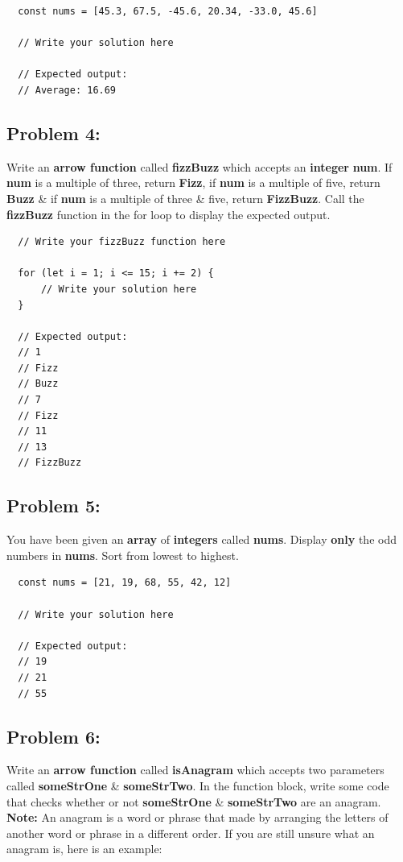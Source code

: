 \documentclass{article}
\begin{document}
\begin{verbatim}
  const nums = [45.3, 67.5, -45.6, 20.34, -33.0, 45.6]

  // Write your solution here

  // Expected output:
  // Average: 16.69 
\end{verbatim}

\subsection*{Problem 4:}
Write an \textbf{arrow function} called \textbf{fizzBuzz} which accepts an \textbf{integer} \textbf{num}. If \textbf{num} is a multiple of three, return \textbf{Fizz}, if \textbf{num} is a multiple of five, return \textbf{Buzz} \& if \textbf{num} is a multiple of three \& five, return \textbf{FizzBuzz}. Call the \textbf{fizzBuzz} function in the for loop to display the expected output.

\begin{verbatim}
  // Write your fizzBuzz function here

  for (let i = 1; i <= 15; i += 2) {
      // Write your solution here
  }

  // Expected output:
  // 1
  // Fizz 
  // Buzz
  // 7
  // Fizz
  // 11
  // 13
  // FizzBuzz
\end{verbatim}

\subsection*{Problem 5:}
You have been given an \textbf{array} of \textbf{integers} called \textbf{nums}. Display \textbf{only} the odd numbers in \textbf{nums}. Sort from lowest to highest.

\begin{verbatim}
  const nums = [21, 19, 68, 55, 42, 12]
        
  // Write your solution here

  // Expected output:
  // 19
  // 21
  // 55
\end{verbatim}

\subsection*{Problem 6:}
Write an \textbf{arrow function} called \textbf{isAnagram} which accepts two parameters called \textbf{someStrOne} \& \textbf{someStrTwo}. In the function block, write some code that checks whether or not \textbf{someStrOne} \& \textbf{someStrTwo} are an anagram. \textbf{Note:} An anagram is a word or phrase that made by arranging the letters of another word or phrase in a different order. If you are still unsure what an anagram is, here is an example:
\end{document}

